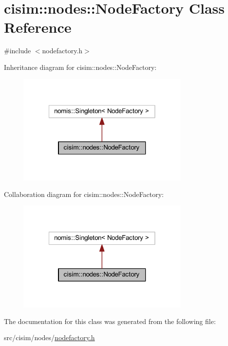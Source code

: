 \hypertarget{classcisim_1_1nodes_1_1_node_factory}{}\section{cisim\+:\+:nodes\+:\+:Node\+Factory Class Reference}
\label{classcisim_1_1nodes_1_1_node_factory}


{\ttfamily \#include $<$nodefactory.\+h$>$}



Inheritance diagram for cisim\+:\+:nodes\+:\+:Node\+Factory\+:\nopagebreak
\begin{figure}[H]
\begin{center}
\leavevmode
\includegraphics[width=242pt]{classcisim_1_1nodes_1_1_node_factory__inherit__graph}
\end{center}
\end{figure}


Collaboration diagram for cisim\+:\+:nodes\+:\+:Node\+Factory\+:\nopagebreak
\begin{figure}[H]
\begin{center}
\leavevmode
\includegraphics[width=242pt]{classcisim_1_1nodes_1_1_node_factory__coll__graph}
\end{center}
\end{figure}


The documentation for this class was generated from the following file\+:\begin{DoxyCompactItemize}
\item 
src/cisim/nodes/\hyperlink{nodefactory_8h}{nodefactory.\+h}\end{DoxyCompactItemize}
